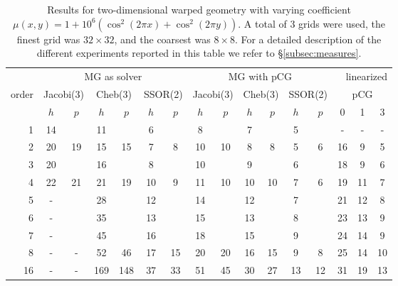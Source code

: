 \documentclass[smallcondensed,final]{svjour3}     %
\begin{document}
\begin{table}
  \caption{\label{tab:2d-fan} Results for two-dimensional warped
    geometry with varying coefficient $\mu(x,y) = 1 + 10^6(\cos^2(2\pi
    x) + \cos^2(2\pi y))$.  A total of 3 grids were used, the finest
    grid was $32\times 32$, and the coarsest was $8\times 8$. For a
    detailed description of the different experiments reported in this
    table we refer to \S\ref{subsec:measures}.}  \centering
  \begin{tabular}{|r|c c|c c|c c||c c|c c|c c||c c c|} 
    \hline
    & \multicolumn{6}{c||}{MG as solver} & \multicolumn{6}{c||}{MG with pCG} & \multicolumn{3}{r|}{linearized} \\
    \cline{2-13}
    \!\!\! order \!\!\!\! &  \multicolumn{2}{c|}{\!\scriptsize  Jacobi(3)\!} &  \multicolumn{2}{c|}{\!\scriptsize Cheb(3)\!} & \multicolumn{2}{c||}{\!\scriptsize  SSOR(2)\!} & \multicolumn{2}{c|}{\!\scriptsize Jacobi(3)\!} &  \multicolumn{2}{c|}{\!\scriptsize Cheb(3)\!} & \multicolumn{2}{c||}{\!\scriptsize SSOR(2)\!} & \multicolumn{3}{c|}{pCG}\\
\hline
 & $h$ & $p$ & $h$ & $p$& $h$ & $p$& $h$ & $p$& $h$ & $p$& $h$ & $p$& 0 & 1 & 3\\
 \cline{2-16}
1 & 14 & & 11 & & 6 & & 8 & & 7 & & 5 & & - & - & - \\
2 & 20 & 19 & 15 & 15 & 7 & 8 & 10 & 10 & 8 & 8 & 5 & 6 & 16 & 9 & 5 \\
3 & 20 & & 16 & & 8 & & 10 & & 9 & & 6 & & 18 & 9 & 6 \\
4 & 22 & 21 & 21 & 19 & 10 & 9 & 11 & 10 & 10 & 10 & 7 & 6 & 19 & 11 & 7\\
5 & -  & & 28 & & 12 & & 14 & & 12 & & 7 & & 21 & 12 & 8  \\
6 & -  & & 35 & & 13 & & 15 & & 13 & & 8 & & 23 & 13 & 9 \\
7 & -  & & 45 & & 16 & & 18 & & 15 & & 9 & & 24 & 14 & 9 \\
8 & -  & - & 52 & 46 & 17 & 15 & 20 & 20 & 16 & 15 & 9 & 8 & 25 & 14 & 10 \\
16 & - & - & 169 & 148 & 37 & 33 & 51 & 45 & 30 & 27 & 13 & 12 & 31 & 19 & 13 \\
\hline
  \end{tabular}
\end{table}
\end{document}
